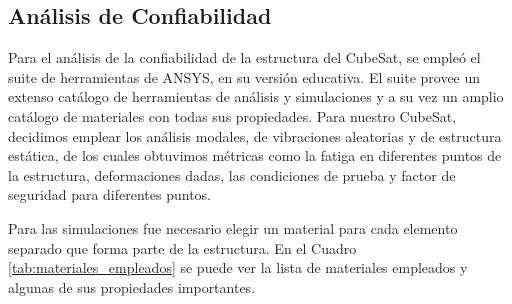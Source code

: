   \subsection{Análisis de Confiabilidad}
    Para el análisis de la confiabilidad de la estructura del CubeSat, se empleó el suite de herramientas de ANSYS, en
    su versión educativa. El suite provee un extenso catálogo de herramientas de análisis y simulaciones y a su vez un
    amplio catálogo de materiales con todas sus propiedades. Para nuestro CubeSat, decidimos emplear los análisis
    modales, de vibraciones aleatorias y de estructura estática, de los cuales obtuvimos métricas como la fatiga en
    diferentes puntos de la estructura, deformaciones dadas, las condiciones de prueba y factor de seguridad para
    diferentes puntos.

    Para las simulaciones fue necesario elegir un material para cada elemento separado que forma parte de la estructura.
    En el Cuadro \ref{tab:materiales_empleados} se puede ver la lista de materiales empleados y algunas de sus
    propiedades importantes.

    \begin{table}[H]
    \centering
    \caption{Lista de materiales empleados.}
    \label{tab:materiales_empleados}
    \end{table}
    \newpage


